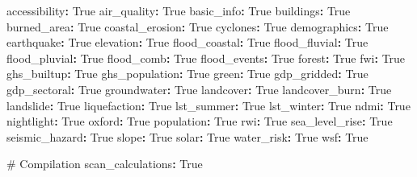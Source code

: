 \documentclass[
  letterpaper,
  DIV=11,
  numbers=noendperiod]{scrreprt}
\newenvironment{Shaded}{\begin{snugshade}}{\end{snugshade}}
\newcommand{\AttributeTok}[1]{\textcolor[rgb]{0.40,0.45,0.13}{#1}}
\newcommand{\CharTok}[1]{\textcolor[rgb]{0.13,0.47,0.30}{#1}}
\newcommand{\CommentTok}[1]{\textcolor[rgb]{0.37,0.37,0.37}{#1}}
\newcommand{\FunctionTok}[1]{\textcolor[rgb]{0.28,0.35,0.67}{#1}}
\newcommand{\KeywordTok}[1]{\textcolor[rgb]{0.00,0.23,0.31}{\textbf{#1}}}
\begin{document}
\begin{Shaded}
\begin{Highlighting}[]
\FunctionTok{accessibility}\KeywordTok{:}\AttributeTok{ }\CharTok{True}
\FunctionTok{air\_quality}\KeywordTok{:}\AttributeTok{ }\CharTok{True}
\FunctionTok{basic\_info}\KeywordTok{:}\AttributeTok{ }\CharTok{True}
\FunctionTok{buildings}\KeywordTok{:}\AttributeTok{ }\CharTok{True}
\FunctionTok{burned\_area}\KeywordTok{:}\AttributeTok{ }\CharTok{True}
\FunctionTok{coastal\_erosion}\KeywordTok{:}\AttributeTok{ }\CharTok{True}
\FunctionTok{cyclones}\KeywordTok{:}\AttributeTok{ }\CharTok{True}
\FunctionTok{demographics}\KeywordTok{:}\AttributeTok{ }\CharTok{True}
\FunctionTok{earthquake}\KeywordTok{:}\AttributeTok{ }\CharTok{True}
\FunctionTok{elevation}\KeywordTok{:}\AttributeTok{ }\CharTok{True}
\FunctionTok{flood\_coastal}\KeywordTok{:}\AttributeTok{ }\CharTok{True}
\FunctionTok{flood\_fluvial}\KeywordTok{:}\AttributeTok{ }\CharTok{True}
\FunctionTok{flood\_pluvial}\KeywordTok{:}\AttributeTok{ }\CharTok{True}
\FunctionTok{flood\_comb}\KeywordTok{:}\AttributeTok{ }\CharTok{True}
\FunctionTok{flood\_events}\KeywordTok{:}\AttributeTok{ }\CharTok{True}
\FunctionTok{forest}\KeywordTok{:}\AttributeTok{ }\CharTok{True}
\FunctionTok{fwi}\KeywordTok{:}\AttributeTok{ }\CharTok{True}
\FunctionTok{ghs\_builtup}\KeywordTok{:}\AttributeTok{ }\CharTok{True}
\FunctionTok{ghs\_population}\KeywordTok{:}\AttributeTok{ }\CharTok{True}
\FunctionTok{green}\KeywordTok{:}\AttributeTok{ }\CharTok{True}
\FunctionTok{gdp\_gridded}\KeywordTok{:}\AttributeTok{ }\CharTok{True}
\FunctionTok{gdp\_sectoral}\KeywordTok{:}\AttributeTok{ }\CharTok{True}
\FunctionTok{groundwater}\KeywordTok{:}\AttributeTok{ }\CharTok{True}
\FunctionTok{landcover}\KeywordTok{:}\AttributeTok{ }\CharTok{True}
\FunctionTok{landcover\_burn}\KeywordTok{:}\AttributeTok{ }\CharTok{True}
\FunctionTok{landslide}\KeywordTok{:}\AttributeTok{ }\CharTok{True}
\FunctionTok{liquefaction}\KeywordTok{:}\AttributeTok{ }\CharTok{True}
\FunctionTok{lst\_summer}\KeywordTok{:}\AttributeTok{ }\CharTok{True}
\FunctionTok{lst\_winter}\KeywordTok{:}\AttributeTok{ }\CharTok{True}
\FunctionTok{ndmi}\KeywordTok{:}\AttributeTok{ }\CharTok{True}
\FunctionTok{nightlight}\KeywordTok{:}\AttributeTok{ }\CharTok{True}
\FunctionTok{oxford}\KeywordTok{:}\AttributeTok{ }\CharTok{True}
\FunctionTok{population}\KeywordTok{:}\AttributeTok{ }\CharTok{True}
\FunctionTok{rwi}\KeywordTok{:}\AttributeTok{ }\CharTok{True}
\FunctionTok{sea\_level\_rise}\KeywordTok{:}\AttributeTok{ }\CharTok{True}
\FunctionTok{seismic\_hazard}\KeywordTok{:}\AttributeTok{ }\CharTok{True}
\FunctionTok{slope}\KeywordTok{:}\AttributeTok{ }\CharTok{True}
\FunctionTok{solar}\KeywordTok{:}\AttributeTok{ }\CharTok{True}
\FunctionTok{water\_risk}\KeywordTok{:}\AttributeTok{ }\CharTok{True}
\FunctionTok{wsf}\KeywordTok{:}\AttributeTok{ }\CharTok{True}

\CommentTok{\# Compilation}
\FunctionTok{scan\_calculations}\KeywordTok{:}\AttributeTok{ }\CharTok{True}
\end{Highlighting}
\end{Shaded}
\end{document}
